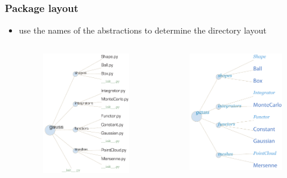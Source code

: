 \begin{frame}
%
  \frametitle{Package layout}
%
  \begin{itemize}
%
  \item use the names of the abstractions to determine the directory layout
%
    \begin{columns}[t]
%
      \begin{column}{0.5\textwidth}
        \begin{figure}
          \includegraphics[scale=0.70]{figures/layout-files.pdf}
        \end{figure}
      \end{column}
%
      \begin{column}{0.5\textwidth}
        \begin{figure}
          \includegraphics[scale=0.70]{figures/layout-namespace.pdf}

\end{figure}
\end{column}
\end{columns}
\end{itemize}
\end{frame}
